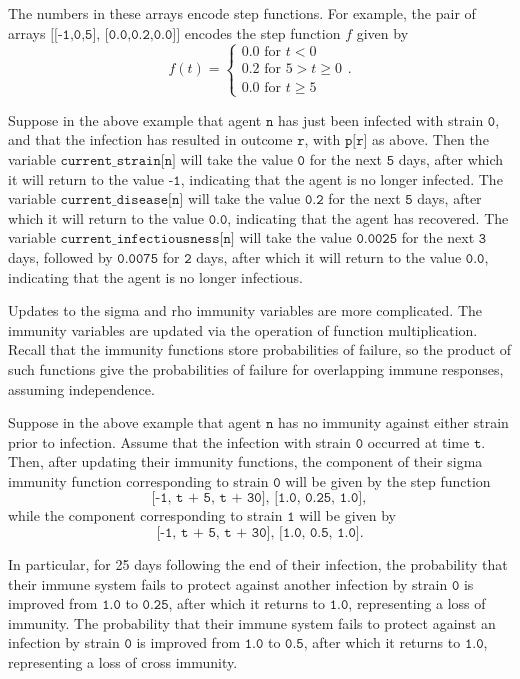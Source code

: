 \documentclass[10pt,letterpaper]{article}
\begin{document}
The numbers in these arrays encode step functions. For example, the pair of arrays $\texttt{[[-1,0,5], [0.0,0.2,0.0]]}$ encodes the step function $f$ given by
\begin{equation}
f(t) =
\begin{cases}
0.0 \text{ for } t < 0 \\
0.2 \text{ for } 5 > t \geq 0 \\
0.0 \text{ for } t \geq 5
\end{cases}.\nonumber
\end{equation}

Suppose in the above example that agent $\texttt{n}$ has just been infected with strain $\texttt{0}$, and that the infection has resulted in outcome $\texttt{r}$, with $\texttt{p[r]}$ as above. Then the variable $\texttt{current{\_}strain[n]}$ will take the value $\texttt{0}$ for the next $\texttt{5}$ days, after which it will return to the value $\texttt{-1}$, indicating that the agent is no longer infected. The variable $\texttt{current{\_}disease[n]}$ will take the value $\texttt{0.2}$ for the next $\texttt{5}$ days, after which it will return to the value $\texttt{0.0}$, indicating that the agent has recovered. The variable $\texttt{current{\_}infectiousness[n]}$ will take the value $\texttt{0.0025}$ for the next $\texttt{3}$ days, followed by $\texttt{0.0075}$ for $\texttt{2}$ days, after which it will return to the value $\texttt{0.0}$, indicating that the agent is no longer infectious.

Updates to the sigma and rho immunity variables are more complicated. The immunity variables are updated via the operation of function multiplication. Recall that the immunity functions store probabilities of failure, so the product of such functions give the probabilities of failure for overlapping immune responses, assuming independence.

Suppose in the above example that agent $\texttt{n}$ has no immunity against either strain prior to infection. Assume that the infection with strain $\texttt{0}$ occurred at time $\texttt{t}$. Then, after updating their immunity functions, the component of their sigma immunity function corresponding to strain $\texttt{0}$ will be given by the step function $$\texttt{[-1, t + 5, t + 30], [1.0, 0.25, 1.0]},$$ while the component corresponding to strain $\texttt{1}$ will be given by $$\texttt{[-1, t + 5, t + 30], [1.0, 0.5, 1.0]}.$$

In particular, for 25 days following the end of their infection, the probability that their immune system fails to protect against another infection by strain $\texttt{0}$ is improved from $\texttt{1.0}$ to $\texttt{0.25}$, after which it returns to $\texttt{1.0}$, representing a loss of immunity. The probability that their immune system fails to protect against an infection by strain $\texttt{0}$ is improved from $\texttt{1.0}$ to $\texttt{0.5}$, after which it returns to $\texttt{1.0}$, representing a loss of cross immunity.
\end{document}
